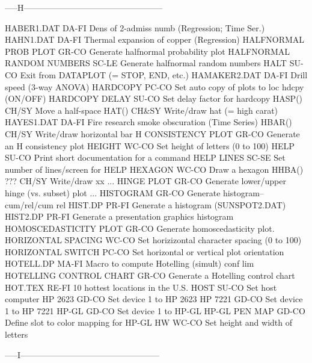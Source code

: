 -----H--------------------------------------------------

HABER1.DAT                  DA-FI Dens of 2-admiss numb (Regression; Time Ser.)
HAHN1.DAT                   DA-FI Thermal expansion of copper (Regression)
HALFNORMAL PROB PLOT        GR-CO Generate halfnormal probability plot
HALFNORMAL RANDOM NUMBERS   SC-LE Generate halfnormal random numbers
HALT                        SU-CO Exit from DATAPLOT (= STOP, END, etc.)
HAMAKER2.DAT                DA-FI Drill speed (3-way ANOVA)
HARDCOPY                    PC-CO Set auto copy of plots to loc hdcpy (ON/OFF)
HARDCOPY DELAY              SU-CO Set delay factor for hardcopy
HASP()                      CH/SY Move a half-space
HAT()                       CH&SY Write/draw hat (= high carat)
HAYES1.DAT                  DA-FI Fire research smoke obscuration (Time Series)
HBAR()                      CH/SY Write/draw horizontal bar
H CONSISTENCY PLOT          GR-CO Generate an H consistency plot
HEIGHT                      WC-CO Set height of letters (0 to 100)
HELP                        SU-CO Print short documentation for a command
HELP LINES                  SC-SE Set number of lines/screen for HELP
HEXAGON                     WC-CO Draw a hexagon
HHBA()  ???                 CH/SY Write/draw xx
... HINGE PLOT              GR-CO Generate lower/upper hinge (vs. subset) plot
... HISTOGRAM               GR-CO Generate histogram--cum/rel/cum rel
HIST.DP                     PR-FI Generate a histogram (SUNSPOT2.DAT)
HIST2.DP                    PR-FI Generate a presentation graphics histogram
HOMOSCEDASTICITY PLOT       GR-CO Generate homoscedasticity plot.
HORIZONTAL SPACING          WC-CO Set horizizontal character spacing (0 to 100)
HORIZONTAL SWITCH           PC-CO Set horizontal or vertical plot orientation
HOTELL.DP                   MA-FI Macro to compute Hotelling (simult) conf lim
HOTELLING CONTROL CHART     GR-CO Generate a Hotelling control chart
HOT.TEX                     RE-FI 10 hottest locations in the U.S.
HOST                        SU-CO Set host computer
HP 2623                     GD-CO Set device 1 to HP 2623
HP 7221                     GD-CO Set device 1 to HP 7221
HP-GL                       GD-CO Set device 1 to HP-GL
HP-GL PEN MAP               GD-CO Define slot to color mapping for HP-GL
HW                          WC-CO Set height and width of letters

-----I--------------------------------------------------

